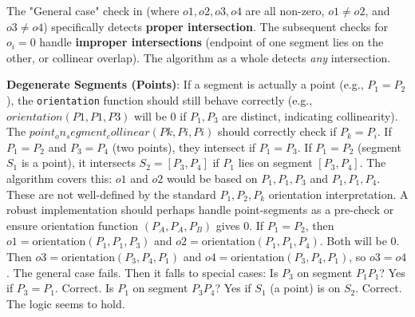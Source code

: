 \begin{insight}
\label{insight:A.2.4.proper_vs_improper_intersect}
The "General case" check in  (where $o1, o2, o3, o4$ are all non-zero, $o1 \neq o2$, and $o3 \neq o4$) specifically detects \textbf{proper intersection}. The subsequent checks for $o_i=0$ handle \textbf{improper intersections} (endpoint of one segment lies on the other, or collinear overlap). The algorithm as a whole detects \textit{any} intersection.
\end{insight}
\begin{warning}
\label{warn:A.2.4.segment_intersect_degenerate}
\textbf{Degenerate Segments (Points)}: If a segment is actually a point (e.g., $P_1=P_2$), the \texttt{orientation} function should still behave correctly (e.g., $orientation(P1, P1, P3)$ will be 0 if $P_1, P_3$ are distinct, indicating collinearity). The $point_on_segment_collinear(Pk, Pi, Pi)$ should correctly check if $P_k=P_i$.
If $P_1=P_2$ and $P_3=P_4$ (two points), they intersect if $P_1=P_3$.
If $P_1=P_2$ (segment $S_1$ is a point), it intersects $S_2=[P_3,P_4]$ if $P_1$ lies on segment $[P_3,P_4]$. The algorithm covers this: $o1$ and $o2$ would be based on $P_1,P_1,P_3$ and $P_1,P_1,P_4$. These are not well-defined by the standard $P_1,P_2,P_k$ orientation interpretation.
A robust implementation should perhaps handle point-segments as a pre-check or ensure orientation function $(P_A, P_A, P_B)$ gives 0. If $P_1=P_2$, then $o1 = \text{orientation}(P_1,P_1,P_3)$ and $o2 = \text{orientation}(P_1,P_1,P_4)$. Both will be 0. Then $o3 = \text{orientation}(P_3,P_4,P_1)$ and $o4 = \text{orientation}(P_3,P_4,P_1)$, so $o3=o4$. The general case fails. Then it falls to special cases: Is $P_3$ on segment $P_1P_1$? Yes if $P_3=P_1$. Correct. Is $P_1$ on segment $P_3P_4$? Yes if $S_1$ (a point) is on $S_2$. Correct.
The logic seems to hold.
\end{warning}

